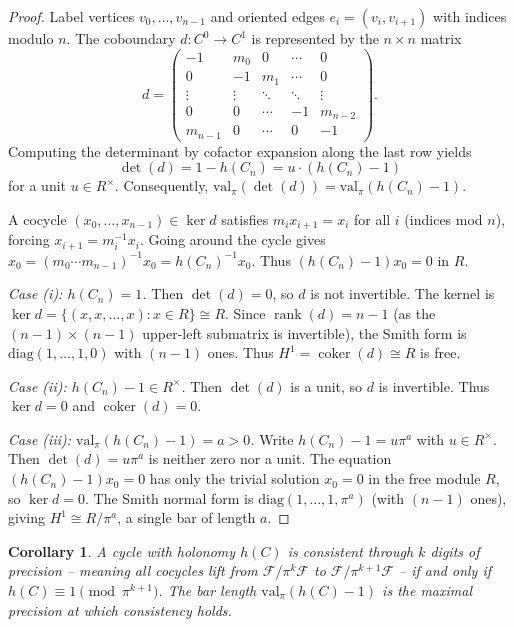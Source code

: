 \documentclass[11pt]{amsart}
\theoremstyle{plain}
\newtheorem{corollary}[theorem]{Corollary}
\theoremstyle{definition}
\newcommand{\valpi}{\mathrm{val}_{\unif}}                   %
\newcommand{\Ring}{R}                          %
\newcommand{\unif}{\pi}                        %
\newcommand{\sheaf}[1]{\mathcal{#1}}                  %
\newcommand{\coboundary}{d}                           %
\DeclareMathOperator{\coker}{coker}                   %
\DeclareMathOperator{\rank}{rank}
\begin{document}
\begin{proof}
Label vertices $v_0, \ldots, v_{n-1}$ and oriented edges $e_i = (v_i, v_{i+1})$ with indices modulo $n$. The coboundary $\coboundary: C^0 \to C^1$ is represented by the $n \times n$ matrix
\[
\coboundary = \begin{pmatrix}
-1 & m_0 & 0 & \cdots & 0 \\
0 & -1 & m_1 & \cdots & 0 \\
\vdots & \vdots & \ddots & \ddots & \vdots \\
0 & 0 & \cdots & -1 & m_{n-2} \\
m_{n-1} & 0 & \cdots & 0 & -1
\end{pmatrix}.
\]
Computing the determinant by cofactor expansion along the last row yields
\[
\det(\coboundary) = 1 - h(C_n) = u \cdot (h(C_n) - 1)
\]
for a unit $u \in \Ring^\times$. Consequently, $\valpi(\det(\coboundary)) = \valpi(h(C_n) - 1)$.

A cocycle $(x_0, \ldots, x_{n-1}) \in \ker \coboundary$ satisfies $m_i x_{i+1} = x_i$ for all $i$ (indices mod $n$), forcing $x_{i+1} = m_i^{-1}x_i$. Going around the cycle gives $x_0 = (m_0 \cdots m_{n-1})^{-1}x_0 = h(C_n)^{-1}x_0$. Thus $(h(C_n) - 1)x_0 = 0$ in $\Ring$.

\textit{Case (i): $h(C_n) = 1$.} Then $\det(\coboundary) = 0$, so $\coboundary$ is not invertible. The kernel is $\ker \coboundary = \{(x,x,\ldots,x) : x \in \Ring\} \cong \Ring$. Since $\rank(\coboundary) = n-1$ (as the $(n-1) \times (n-1)$ upper-left submatrix is invertible), the Smith form is $\mathrm{diag}(1,\ldots,1,0)$ with $(n-1)$ ones. Thus $H^1 = \coker(\coboundary) \cong \Ring$ is free.

\textit{Case (ii): $h(C_n) - 1 \in \Ring^\times$.} Then $\det(\coboundary)$ is a unit, so $\coboundary$ is invertible. Thus $\ker \coboundary = 0$ and $\coker(\coboundary) = 0$.

\textit{Case (iii): $\valpi(h(C_n)-1) = a > 0$.} Write $h(C_n) - 1 = u\unif^a$ with $u \in \Ring^\times$. Then $\det(\coboundary) = u\unif^a$ is neither zero nor a unit. The equation $(h(C_n) - 1)x_0 = 0$ has only the trivial solution $x_0 = 0$ in the free module $\Ring$, so $\ker \coboundary = 0$. The Smith normal form is $\mathrm{diag}(1,\ldots,1,\unif^a)$ (with $(n-1)$ ones), giving $H^1 \cong \Ring/\unif^a$, a single bar of length $a$.
\end{proof}

\begin{corollary}
A cycle with holonomy $h(C)$ is consistent through $k$ digits of precision -- meaning all cocycles lift from $\sheaf{F}/\unif^k\sheaf{F}$ to $\sheaf{F}/\unif^{k+1}\sheaf{F}$ -- if and only if $h(C) \equiv 1 \pmod{\unif^{k+1}}$. The bar length $\valpi(h(C)-1)$ is the maximal precision at which consistency holds.
\end{corollary}
\end{document}
